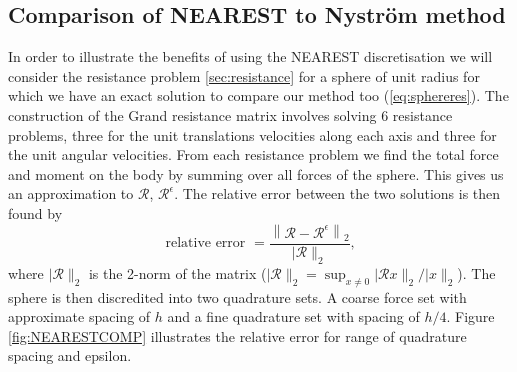 \subsection{Comparison of NEAREST to Nyström method}
In order to illustrate the benefits of using the NEAREST discretisation we will consider the resistance problem \cref{sec:resistance} for a sphere of unit radius for which we have an exact solution to compare our method too (\cref{eq:sphereres}). The construction of the Grand resistance matrix involves solving $6$ resistance problems, three for the unit translations velocities along each axis and three for the unit angular velocities. From each resistance problem we find the total force and moment on the body by summing over all forces of the sphere. This gives us an approximation to $\mathcal{R}$, $\mathcal{R}^\epsilon$. The relative error between the two solutions is then found by 
\begin{equation}
    \text { relative error }=\frac{\left\lVert \mathcal{R}-\mathcal{R}^{\epsilon}\right\rVert_{2}}{\lvert\mathcal{R}\rVert_{2}} \text {, }
    \label{eq:RelativeError}
\end{equation}
where ${\lvert\mathcal{R}\rVert_{2}}$ is the 2-norm of the matrix ($\lvert\mathcal{R}\rVert_{2}=\sup_{x \neq 0}\lvert\mathcal{R}x\rVert_{2} /\lvert x\rVert_{2}$).
The sphere is then discredited into two quadrature sets. A coarse force set with approximate spacing of $h$ and a fine quadrature set with spacing of $h/4$. Figure \ref{fig:NEARESTCOMP} illustrates the relative error for range of quadrature spacing and epsilon. 
